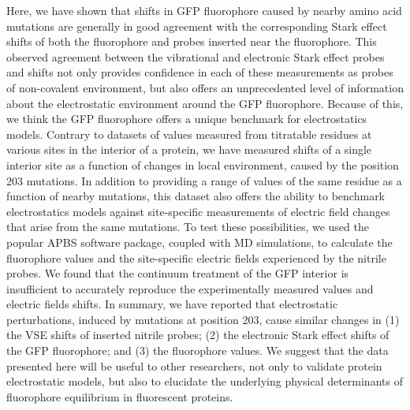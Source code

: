 Here, we have shown that shifts in GFP fluorophore \pKa{} caused by nearby amino acid mutations are generally in good agreement with the corresponding Stark effect shifts of both the fluorophore and \pCNF{} probes inserted near the fluorophore.
This observed agreement between the vibrational and electronic Stark effect probes and \pKa{} shifts not only provides confidence in each of these measurements as probes of non-covalent environment, but also offers an unprecedented level of information about the electrostatic environment around the GFP fluorophore.
Because of this, we think the GFP fluorophore offers a unique benchmark for electrostatics models.
Contrary to datasets of \pKa{} values measured from titratable residues at various sites in the interior of a protein, we have measured \pKa{} shifts of a single interior site as a function of changes in local environment, caused by the position 203 mutations.
In addition to providing a range of \pKa{} values of the same residue as a function of nearby mutations, this dataset also offers the ability to benchmark electrostatics models against site-specific measurements of electric field changes that arise from the same mutations.
To test these possibilities, we used the popular APBS software package, coupled with MD simulations, to calculate the fluorophore \pKa{} values and the site-specific electric fields experienced by the nitrile probes.
We found that the continuum treatment of the GFP interior is insufficient to accurately reproduce the experimentally measured \pKa{} values and electric fields shifts.
In summary, we have reported that electrostatic perturbations, induced by mutations at position 203, cause similar changes in (1) the VSE shifts of inserted nitrile probes; (2) the electronic Stark effect shifts of the GFP fluorophore; and (3) the fluorophore \pKa{} values.
We suggest that the data presented here will be useful to other researchers, not only to validate protein electrostatic models, but also to elucidate the underlying physical determinants of fluorophore equilibrium in fluorescent proteins. 

